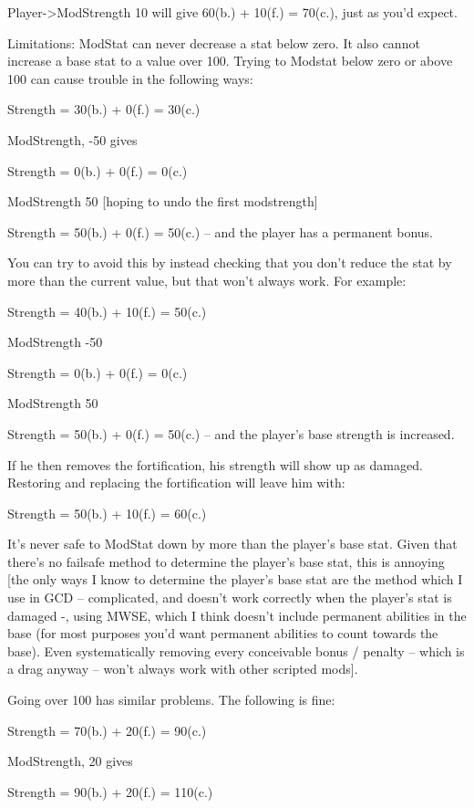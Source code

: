 \documentclass[
]{article}
\begin{document}
Player-\textgreater ModStrength 10 will give 60(b.) + 10(f.) = 70(c.),
just as you'd expect.

Limitations: ModStat can never decrease a stat below zero. It also
cannot increase a base stat to a value over 100. Trying to Modstat below
zero or above 100 can cause trouble in the following ways:

Strength = 30(b.) + 0(f.) = 30(c.)

ModStrength, -50 gives

Strength = 0(b.) + 0(f.) = 0(c.)

ModStrength 50 {[}hoping to undo the first modstrength{]}

Strength = 50(b.) + 0(f.) = 50(c.) -- and the player has a permanent
bonus.

You can try to avoid this by instead checking that you don't reduce the
stat by more than the current value, but that won't always work. For
example:

Strength = 40(b.) + 10(f.) = 50(c.)

ModStrength -50

Strength = 0(b.) + 0(f.) = 0(c.)

ModStrength 50

Strength = 50(b.) + 0(f.) = 50(c.) -- and the player's base strength is
increased.

If he then removes the fortification, his strength will show up as
damaged. Restoring and replacing the fortification will leave him with:

Strength = 50(b.) + 10(f.) = 60(c.)

It's never safe to ModStat down by more than the player's base stat.
Given that there's no failsafe method to determine the player's base
stat, this is annoying {[}the only ways I know to determine the player's
base stat are the method which I use in GCD -- complicated, and doesn't
work correctly when the player's stat is damaged -, using MWSE, which I
think doesn't include permanent abilities in the base (for most purposes
you'd want permanent abilities to count towards the base). Even
systematically removing every conceivable bonus / penalty -- which is a
drag anyway -- won't always work with other scripted mods{]}.

Going over 100 has similar problems. The following is fine:

Strength = 70(b.) + 20(f.) = 90(c.)

ModStrength, 20 gives

Strength = 90(b.) + 20(f.) = 110(c.)
\end{document}
